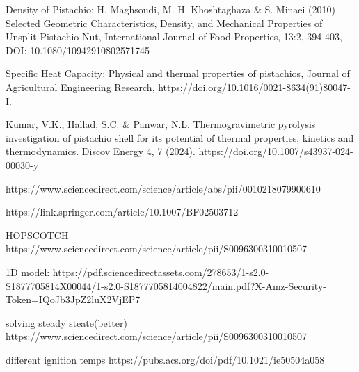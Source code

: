 Density of Pistachio:
H. Maghsoudi, M. H. Khoshtaghaza & S. Minaei (2010) Selected Geometric
Characteristics, Density, and Mechanical Properties of Unsplit Pistachio Nut, International
Journal of Food Properties, 13:2, 394-403, DOI: 10.1080/10942910802571745

Specific Heat Capacity:
Physical and thermal properties of pistachios,
Journal of Agricultural Engineering Research,
https://doi.org/10.1016/0021-8634(91)80047-I.

Kumar, V.K., Hallad, S.C. & Panwar, N.L. Thermogravimetric pyrolysis investigation of pistachio shell for its potential of thermal properties, kinetics and thermodynamics. Discov Energy 4, 7 (2024). https://doi.org/10.1007/s43937-024-00030-y

https://www.sciencedirect.com/science/article/abs/pii/0010218079900610

https://link.springer.com/article/10.1007/BF02503712

HOPSCOTCH https://www.sciencedirect.com/science/article/pii/S0096300310010507

1D model: https://pdf.sciencedirectassets.com/278653/1-s2.0-S1877705814X00044/1-s2.0-S1877705814004822/main.pdf?X-Amz-Security-Token=IQoJb3JpZ2luX2VjEP7%

solving steady steate(better) https://www.sciencedirect.com/science/article/pii/S0096300310010507


different ignition temps
https://pubs.acs.org/doi/pdf/10.1021/ie50504a058
